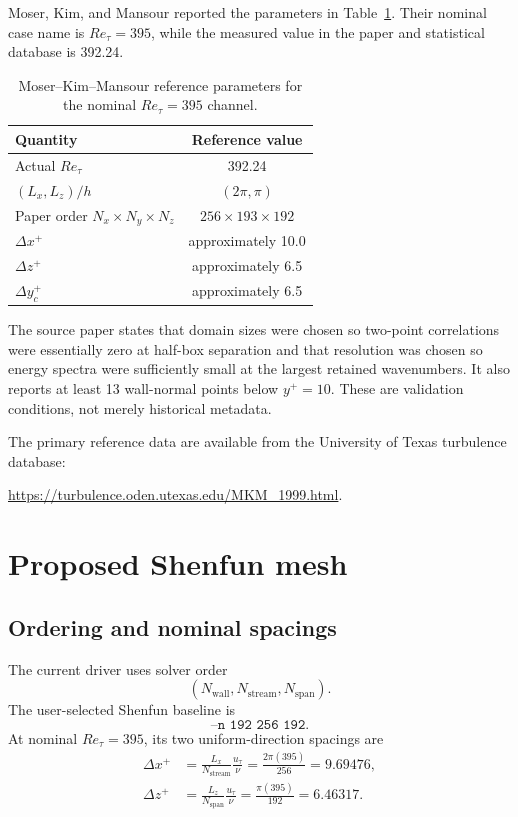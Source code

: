 \documentclass[11pt]{article}
\begin{document}
Moser, Kim, and Mansour reported the parameters in
Table~\ref{tab:mkm_reference}.  Their nominal case name is $Re_{\tau}=395$,
while the measured value in the paper and statistical database is 392.24.

\begin{table}[ht]
  \centering
  \caption{Moser--Kim--Mansour reference parameters for the nominal
  $Re_{\tau}=395$ channel.}
  \label{tab:mkm_reference}
  \begin{tabular}{lc}
    \toprule
    Quantity & Reference value \\
    \midrule
    Actual $Re_{\tau}$ & 392.24 \\
    $(L_x,L_z)/h$ & $(2\pi,\pi)$ \\
    Paper order $N_x\times N_y\times N_z$ & $256\times193\times192$ \\
    $\Delta x^+$ & approximately 10.0 \\
    $\Delta z^+$ & approximately 6.5 \\
    $\Delta y_c^+$ & approximately 6.5 \\
    \bottomrule
  \end{tabular}
\end{table}

The source paper states that domain sizes were chosen so two-point
correlations were essentially zero at half-box separation and that resolution
was chosen so energy spectra were sufficiently small at the largest retained
wavenumbers.  It also reports at least 13 wall-normal points below $y^+=10$.
These are validation conditions, not merely historical metadata.

The primary reference data are available from the University of Texas
turbulence database:
\begin{center}
  \url{https://turbulence.oden.utexas.edu/MKM_1999.html}.
\end{center}

\section{Proposed Shenfun mesh}

\subsection{Ordering and nominal spacings}

The current driver uses solver order
\[
  (N_{\mathrm{wall}},N_{\mathrm{stream}},N_{\mathrm{span}}).
\]
The user-selected Shenfun baseline is
\begin{equation}
  \boxed{\texttt{--n 192 256 192}}.
  \label{eq:solver_n}
\end{equation}
At nominal $Re_{\tau}=395$, its two uniform-direction spacings are
\begin{align}
  \Delta x^+
  &=\frac{L_x}{N_{\mathrm{stream}}}\frac{u_{\tau}}{\nu}
    =\frac{2\pi(395)}{256}=9.69476,\\
  \Delta z^+
  &=\frac{L_z}{N_{\mathrm{span}}}\frac{u_{\tau}}{\nu}
    =\frac{\pi(395)}{192}=6.46317.
  \label{eq:horizontal_spacing}
\end{align}
\end{document}
